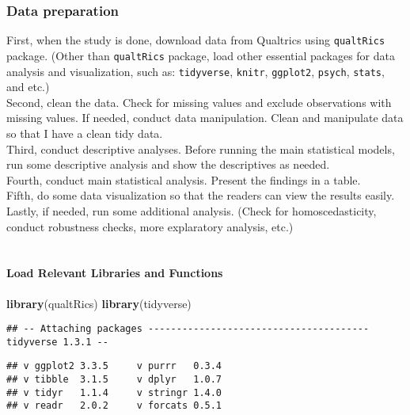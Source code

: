 \documentclass[]{article}
\newenvironment{Shaded}{\begin{snugshade}}{\end{snugshade}}
\newcommand{\KeywordTok}[1]{\textcolor[rgb]{0.13,0.29,0.53}{\textbf{#1}}}
\newcommand{\NormalTok}[1]{#1}
\let\oldparagraph\paragraph
\renewcommand{\paragraph}[1]{\oldparagraph{#1}\mbox{}}
\begin{document}
\hypertarget{data-preparation}{%
\subsubsection{Data preparation}\label{data-preparation}}

First, when the study is done, download data from Qualtrics using
\texttt{qualtRics} package. (Other than \texttt{qualtRics} package, load
other essential packages for data analysis and visualization, such as:
\texttt{tidyverse}, \texttt{knitr}, \texttt{ggplot2}, \texttt{psych},
\texttt{stats}, and etc.)\\
Second, clean the data. Check for missing values and exclude
observations with missing values. If needed, conduct data manipulation.
Clean and manipulate data so that I have a clean tidy data.\\
Third, conduct descriptive analyses. Before running the main statistical
models, run some descriptive analysis and show the descriptives as
needed.\\
Fourth, conduct main statistical analysis. Present the findings in a
table.\\
Fifth, do some data visualization so that the readers can view the
results easily.\\
Lastly, if needed, run some additional analysis. (Check for
homoscedasticity, conduct robustness checks, more explaratory analysis,
etc.)\\
~\\

\hypertarget{load-relevant-libraries-and-functions}{%
\paragraph{Load Relevant Libraries and
Functions}\label{load-relevant-libraries-and-functions}}

\begin{Shaded}
\begin{Highlighting}[]
\KeywordTok{library}\NormalTok{(qualtRics)}
\KeywordTok{library}\NormalTok{(tidyverse)}
\end{Highlighting}
\end{Shaded}

\begin{verbatim}
## -- Attaching packages --------------------------------------- tidyverse 1.3.1 --
\end{verbatim}

\begin{verbatim}
## v ggplot2 3.3.5     v purrr   0.3.4
## v tibble  3.1.5     v dplyr   1.0.7
## v tidyr   1.1.4     v stringr 1.4.0
## v readr   2.0.2     v forcats 0.5.1
\end{verbatim}
\end{document}
